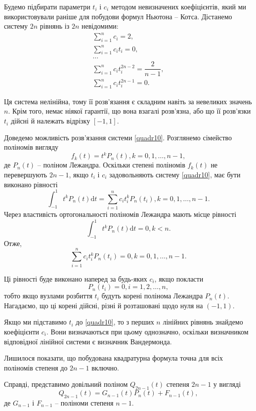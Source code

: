 \documentclass[14pt,twoside]{extreport}
\theoremstyle{mystyle}
\numberwithin{equation}{chapter}
\begin{document}
Будемо підбирати параметри $t_i$ і $c_i$ методом невизначених коефіцієнтів, який ми використовували раніше для побудови формул Ньютона -- Котса. Дістанемо систему $2n$ рівнянь із $2n$ невідомими:
\begin{equation}\label{quadr10}
\begin{array}{l}
\displaystyle \sum_{i=1}^{n}c_{i} = 2,\\
\displaystyle \sum_{i=1}^{n}c_{i}t_{i} = 0,\\
\ldots\\
\displaystyle \sum_{i=1}^{n}c_{i}t_{i}^{2n-2} = \dfrac{2}{n-1},\\
\displaystyle \sum_{i=1}^{n}c_{i}t_{i}^{2n-1} = 0.
\end{array}
\end{equation}

Ця система нелінійна, тому її розв'язання є складним навіть за невеликих значень $n$. Крім того, немає ніякої гарантії, що вона взагалі розв'язна, або що її розв'язки $t_i$ дійсні й належать відрізку $[-1, 1]$.

Доведемо можливість розв'язання системи \eqref{quadr10}. Розглянемо сімейство поліномів вигляду
\[
f_{k}(t)=t^{k}P_{n}(t), k=0, 1, \ldots, n-1,
\]
де $P_n(t)$ -- поліном Лежандра. Оскільки степені поліномів $f_k(t)$ не перевершують $2n - 1$, якщо $t_i$ і $c_i$ задовольняють систему \eqref{quadr10}, має бути виконано рівності
\[
\int_{-1}^{1}t^{k}P_{n}(t)\mathrm{d}t=\sum_{i=1}^{n}c_{i}t_{i}^{k}P_{n}(t_{i}), k=0, 1, \ldots, n-1.
\]
Через властивість ортогональності поліномів Лежандра мають місце рівності
\[
\int_{-1}^{1}t^{k}P_{n}(t)\mathrm{d}t=0, k<n.
\]
Отже,
\[
\displaystyle \sum_{i=1}^{n}c_{i}t_{i}^{k}P_{n}(t_{i})=0, k=0, 1, \ldots, n-1.
\]

Ці рівності буде виконано наперед за будь-яких $c_i$, якщо покласти
\[
 P_n(t_i) = 0, i = 1, 2, \ldots , n,
\]
тобто якщо вузлами розбиття $t_i$ будуть корені полінома Лежандра $P_n(t)$. Нагадаємо, що ці корені дійсні, різні й розташовані щодо нуля на $(-1, 1)$.

Якщо ми підставимо $t_i$ до \eqref{quadr10}, то з перших $n$ лінійних рівнянь знайдемо коефіцієнти $c_i$. Вони визначаються при цьому однозначно, оскільки визначником відповідної лінійної системи є визначник Вандермонда.

Лишилося показати, що побудована квадратурна формула точна для всіх поліномів степеня до $2n - 1$ включно.

Справді, представимо довільний поліном $Q_{2n-1}(t)$ степеня $2n - 1$ у вигляді
\[
Q_{2n-1}(t)=G_{n-1}(t)P_{n}(t)+F_{n-1}(t),
\]
де $G_{n-1}$ і $F_{n-1}$ -- поліноми степеня $n - 1$.
\end{document}
